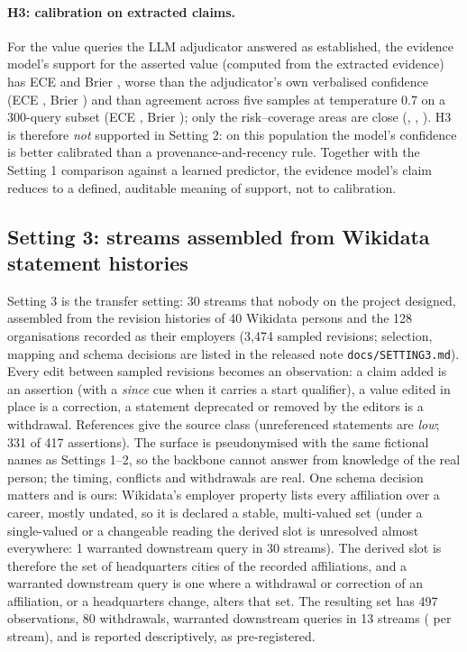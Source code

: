 \paragraph{H3: calibration on extracted claims.} For the \RqTwoSupN{} value queries the LLM adjudicator answered as established, the evidence model's support for the asserted value (computed from the extracted evidence) has ECE \RqTwoSupEce{} and Brier \RqTwoSupBrier, worse than the adjudicator's own verbalised confidence (ECE \RqTwoVerbEce, Brier \RqTwoVerbBrier) and than agreement across five samples at temperature 0.7 on a 300-query subset (ECE \RqTwoSampEce, Brier \RqTwoSampBrier); only the risk--coverage areas are close (\RqTwoSupAurc, \RqTwoVerbAurc, \RqTwoSampAurc). H3 is therefore \emph{not} supported in Setting 2: on this population the model's confidence is better calibrated than a provenance-and-recency rule. Together with the Setting 1 comparison against a learned predictor, the evidence model's claim reduces to a defined, auditable meaning of support, not to calibration.

\subsection{Setting 3: streams assembled from Wikidata statement histories}

Setting 3 is the transfer setting: 30 streams that nobody on the project designed, assembled from the revision histories of 40 Wikidata persons and the 128 organisations recorded as their employers (3,474 sampled revisions; selection, mapping and schema decisions are listed in the released note \texttt{docs/SETTING3.md}). Every edit between sampled revisions becomes an observation: a claim added is an assertion (with a \emph{since} cue when it carries a start qualifier), a value edited in place is a correction, a statement deprecated or removed by the editors is a withdrawal. References give the source class (unreferenced statements are \emph{low}; 331 of 417 assertions). The surface is pseudonymised with the same fictional names as Settings 1--2, so the backbone cannot answer from knowledge of the real person; the timing, conflicts and withdrawals are real. One schema decision matters and is ours: Wikidata's employer property lists every affiliation over a career, mostly undated, so it is declared a stable, multi-valued set (under a single-valued or a changeable reading the derived slot is unresolved almost everywhere: 1 warranted downstream query in 30 streams). The derived slot is therefore the set of headquarters cities of the recorded affiliations, and a warranted downstream query is one where a withdrawal or correction of an affiliation, or a headquarters change, alters that set. The resulting set has 497 observations, 80 withdrawals, \sThreeWarrTotal{} warranted downstream queries in 13 streams (\sThreeWarrPerStream{} per stream), and is reported descriptively, as pre-registered.

